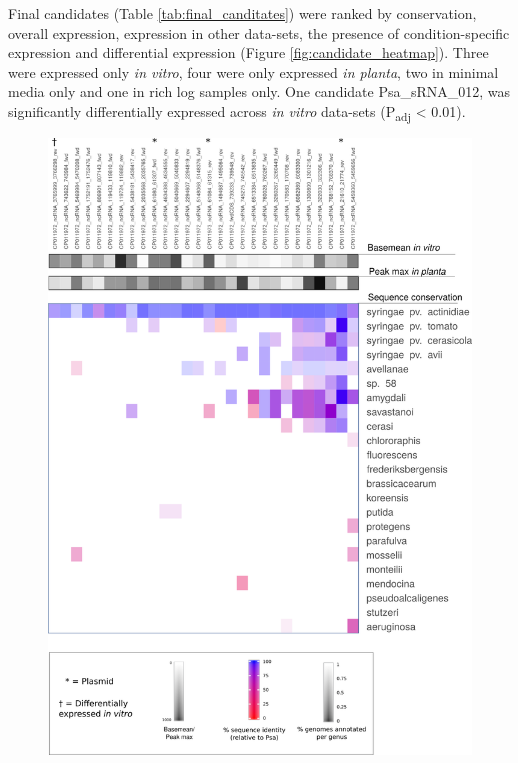Final candidates (Table \ref{tab:final_canditates}) were ranked by conservation, overall expression, expression in other data-sets, the presence of condition-specific expression and differential expression (Figure \ref{fig:candidate_heatmap}). Three were expressed only \textit{in vitro}, four were only expressed \textit{in planta}, two in minimal media only and one in rich log samples only. One candidate Psa\_sRNA\_012, was significantly differentially expressed across \textit{in vitro} data-sets (P\textsubscript{adj} < 0.01). 

\begin{figure}[H]
    \centering
    \includegraphics[scale=0.95]{psa/psa_ncRNA/final_candidates_heatmap2.png}

\end{figure}
